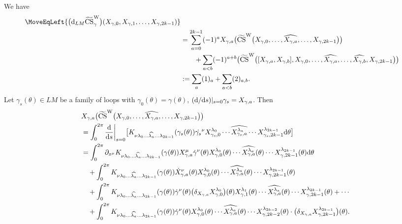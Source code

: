 \documentclass[pdftex]{sigma}
\numberwithin{equation}{section}
\theoremstyle{definition}
\newcommand{\bm}{ M}
\newcommand{\ocs}{\widetilde{{\rm CS}}}
\begin{document}
We have
\begin{align*}
 \MoveEqLeft{\bigl({\rm d}_{L\bm} \ocs^{\rm W}_\gamma \bigr)
 (X_{\gamma ,0}, X_{\gamma ,1},\dots, X_{\gamma ,2k-1} ) }\nonumber\\
 &=
 \sum_{a=0}^{2k-1}
 (-1)^a X_{\gamma ,a}
 \bigl(\ocs^{\rm W} \bigl(X_{\gamma ,0},\dots,
 \widehat{X_{\gamma ,a}},
 \dots, X_{\gamma ,2k-1}\bigr)\bigr) \\
&\qquad +
\sum_{a<b} (-1)^{a+b}
 \bigl(\ocs^{\rm W} \bigl( [X_{\gamma , a}, X_{\gamma , b}],
 X_{\gamma ,0},\dots, \widehat{X_{\gamma ,a}},
 \dots, \widehat{X_{\gamma , b}}, X_{\gamma ,2k-1}\bigr)\bigr) \nonumber \\
 &:= \sum_a (1)_a + \sum_{a<b}(2)_{a,b}\nonumber.
 \end{align*}
Let
$\gamma_s (\theta) \in L{\bm} $ be a family of loops with
$\gamma_0 (\theta ) = \gamma (\theta)$,
$({\rm d}/{\rm d}s)|_{s=0} \gamma_s = X_{\gamma , a} $.
Then
\begin{align}\label{eq:4}
& X_{\gamma ,a}
 \bigl(\ocs^{\rm W} \bigl(X_{\gamma ,0},\dots, \widehat{X_{\gamma ,a}},
 \dots, X_{\gamma ,2k-1}\bigr)\bigr) \nonumber \\
 &=
\int_{0}^{2\pi}
 {\frac{{\rm d}}{{\rm d}s}}\biggl|_{s=0}
\bigl[K_{\nu \lambda_0 \dots \widehat{\lambda_a}\dots \lambda_{2k-1}}
(\gamma_s (\theta )) {\dot{\gamma_s}^\nu}
X_{\gamma_s,0}^{\lambda_0}
\cdots \widehat{X_{\gamma_s ,a}^{\lambda_a}}\cdots
X_{\gamma_s,2k-1}^{\lambda_{2k-1}}
 {\rm d}\theta \bigr] \nonumber\\
&=
\int_{0}^{2\pi}
 \partial_{x^\mu} K_{\nu \lambda_0 \dots \widehat{\lambda_a}\dots\lambda_{2k-1}}
(\gamma(\theta))
X_{\gamma, a}^{\mu} \dot{\gamma}^\nu (\theta)
X_{\gamma ,0}^{\lambda_0 } (\theta)
\cdots \widehat{X_{\gamma ,a}^{\lambda_a}}(\theta)\cdots
X_{\gamma ,2k-1}^{\lambda_{2k-1} } (\theta)
 {\rm d}\theta \nonumber\\
&\quad{} +
\int_{0}^{2\pi}
K_{\nu \lambda_0 \dots \widehat{\lambda_a}\dots \lambda_{2k-1}} (\gamma (\theta) )
\dot{X}_{\gamma ,a}^\nu (\theta )
X_{\gamma ,0}^{\lambda_0 } (\theta)
\cdots\widehat{X_{\gamma ,a}^{\lambda_a}}(\theta)\cdots
X_{\gamma ,2k-1}^{\lambda_{2k-1} } (\theta) \\
&\quad{} +
\int_{0}^{2\pi}
K_{\nu \lambda_0 \dots\widehat{\lambda_a}\dots \lambda_{2k-1}} (\gamma (\theta) )
\dot{\gamma}^\nu (\theta)
\bigl(\delta_{X_{\gamma, a}}X_{\gamma, 0}^{\lambda_0}\bigr)(\theta)
X_{\gamma ,1}^{\lambda_1 } (\theta)
\cdots\widehat{X_{\gamma ,a}^{\lambda_a}}(\theta) \cdots X_{\gamma ,2k-1}^{\lambda_{2k-1} } (\theta) + \cdots\nonumber \\
&\quad{} +
\int_{0}^{2\pi}
K_{\nu \lambda_0 \dots\widehat{\lambda_a}\dots \lambda_{2k-1}} (\gamma (\theta) )
\dot{\gamma}^\nu (\theta)
X_{\gamma ,0}^{\lambda_0 } (\theta)
\cdots\widehat{X_{\gamma ,a}^{\lambda_a}}(\theta)\cdots
X_{\gamma,2k-2}^{\lambda_{2k-2} } (\theta) \nonumber
 \cdot
 \bigl(\delta_{X_{\gamma, a}}X_{\gamma, 2k-1}^{\lambda_{2k-1}} \bigr)(\theta).\nonumber
\end{align}
\end{document}
